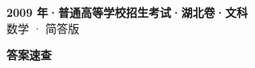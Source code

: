 \documentclass[zihao=-4, a4paper]{ctexart}
\begin{document}
\begin{center}
  {\Large\bfseries 2009 年·普通高等学校招生考试·湖北卷·文科}\\[4pt]
  {\large 数学 · 简答版}
\end{center}
\medskip
{}

\clearpage
{}
\begin{center}{\Large\bfseries 答案速查}\end{center}
\medskip

\end{document}
